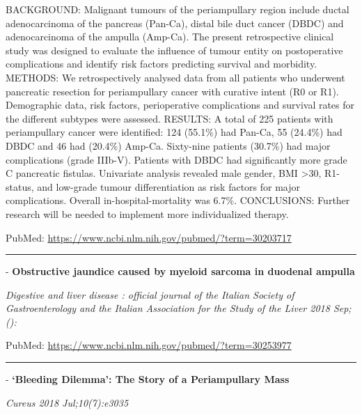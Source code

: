 \documentclass[]{article}
\begin{document}
BACKGROUND: Malignant tumours of the periampullary region include ductal
adenocarcinoma of the pancreas (Pan-Ca), distal bile duct cancer (DBDC)
and adenocarcinoma of the ampulla (Amp-Ca). The present retrospective
clinical study was designed to evaluate the influence of tumour entity
on postoperative complications and identify risk factors predicting
survival and morbidity. METHODS: We retrospectively analysed data from
all patients who underwent pancreatic resection for periampullary cancer
with curative intent (R0 or R1). Demographic data, risk factors,
perioperative complications and survival rates for the different
subtypes were assessed. RESULTS: A total of 225 patients with
periampullary cancer were identified: 124 (55.1\%) had Pan-Ca, 55
(24.4\%) had DBDC and 46 had (20.4\%) Amp-Ca. Sixty-nine patients
(30.7\%) had major complications (grade IIIb-V). Patients with DBDC had
significantly more grade C pancreatic fistulas. Univariate analysis
revealed male gender, BMI \textgreater{}30, R1-status, and low-grade
tumour differentiation as risk factors for major complications. Overall
in-hospital-mortality was 6.7\%. CONCLUSIONS: Further research will be
needed to implement more individualized therapy.

PubMed: \url{https://www.ncbi.nlm.nih.gov/pubmed/?term=30203717}

{}

{}

\begin{center}\rule{0.5\linewidth}{\linethickness}\end{center}

 - \textbf{Obstructive jaundice caused by myeloid sarcoma in duodenal
ampulla}

\emph{Digestive and liver disease : official journal of the Italian
Society of Gastroenterology and the Italian Association for the Study of
the Liver 2018 Sep;():}

PubMed: \url{https://www.ncbi.nlm.nih.gov/pubmed/?term=30253977}

{}

{}

\begin{center}\rule{0.5\linewidth}{\linethickness}\end{center}

 - \textbf{`Bleeding Dilemma': The Story of a Periampullary Mass}

\emph{Cureus 2018 Jul;10(7):e3035}
\end{document}
